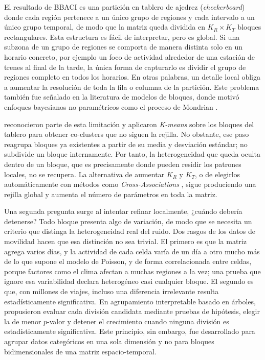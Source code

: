 El resultado de \ac{BBACI} es una partición en tablero de ajedrez
(\emph{checkerboard}) donde cada región pertenece a un único grupo de regiones y
cada intervalo a un único grupo temporal, de modo que la matriz queda
dividida en $K_R \times K_T$ bloques rectangulares. Esta estructura es
fácil de interpretar, pero es global. Si una subzona de un grupo de
regiones se comporta de manera distinta solo en un horario concreto, por
ejemplo un foco de actividad alrededor de una estación de trenes al final
de la tarde, la única forma de capturarlo es dividir el grupo de regiones
completo en todos los horarios. En otras palabras, un detalle local obliga
a aumentar la resolución de toda la fila o columna de la partición. Este
problema también fue señalado en la literatura de modelos de bloques, donde
motivó enfoques bayesianos no paramétricos como el proceso de Mondrian
\cite{Roy2008}.

\cite{Liu2021} reconocieron parte de esta limitación y aplicaron
\textit{K-means} sobre los bloques del tablero para obtener co-clusters que no
siguen la rejilla. No obstante, ese paso reagrupa bloques ya
existentes a partir de su media y desviación estándar; no subdivide
un bloque internamente. Por tanto, la heterogeneidad que queda oculta dentro
de un bloque, que es precisamente donde pueden residir los patrones locales,
no se recupera. La alternativa de aumentar $K_R$ y $K_T$, o de elegirlos
automáticamente con métodos como \emph{Cross-Associations} \cite{Chakrabarti2004},
sigue produciendo una rejilla global y aumenta el número de parámetros en
toda la matriz.

Una segunda pregunta surge al intentar refinar localmente, ¿cuándo debería detenerse?
Todo bloque presenta algo de variación, de modo que se necesita un criterio
que distinga la heterogeneidad real del ruido. Dos rasgos de los datos de
movilidad hacen que esa distinción no sea trivial. El primero es que la matriz
agrega varios días, y la actividad de cada celda varía de un día a otro mucho
más de lo que supone el modelo de Poisson, y de forma correlacionada entre
celdas, porque factores como el clima afectan a muchas regiones a la vez; una
prueba que ignore esa variabilidad declara heterogéneo casi cualquier bloque. El
segundo es que, con millones de viajes, incluso una diferencia irrelevante
resulta estadísticamente significativa. En agrupamiento interpretable
basado en árboles, \cite{Hu2025} propusieron evaluar cada división candidata
mediante pruebas de hipótesis, elegir la de menor $p$-valor y detener el
crecimiento cuando ninguna división es estadísticamente significativa. Este
principio, sin embargo, fue desarrollado para agrupar datos categóricos en
una sola dimensión y no para bloques bidimensionales de una matriz
espacio-temporal.

